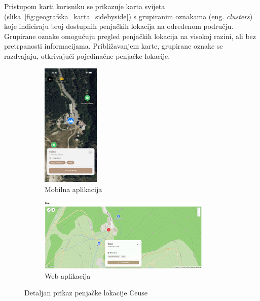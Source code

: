 Pristupom karti korisniku se prikazuje karta svijeta (slika~\ref{fig:geografska_karta_sidebyside}) s grupiranim oznakama (eng. \textit{clusters}) koje indiciraju broj dostupnih penjačkih lokacija na određenom području. Grupirane oznake omogućuju pregled penjačkih lokacija na visokoj razini, ali bez pretrpanosti informacijama. Približavanjem karte, grupirane oznake se razdvajaju, otkrivajući pojedinačne penjačke lokacije.

\begin{figure}[H]
    \centering
    \begin{subfigure}[b]{\textwidth}
        \centering
        \includegraphics[width=0.3\textwidth]{images/implementacija/geo_karta_ceuse.png}
        \caption{Mobilna aplikacija}
        \label{fig:geografska_karta_ceuse_mob}
    \end{subfigure}
    \hfill
    \begin{subfigure}[b]{\textwidth}
        \centering
        \includegraphics[width=0.9\textwidth]{images/implementacija/web/map_selected.png}
        \caption{Web aplikacija}
        \label{fig:geografska_karta_ceuse_web}
    \end{subfigure}
    \caption{Detaljan prikaz penjačke lokacije Ceuse}
    \label{fig:geografska_karta_ceuse_sidebyside}
\end{figure}

